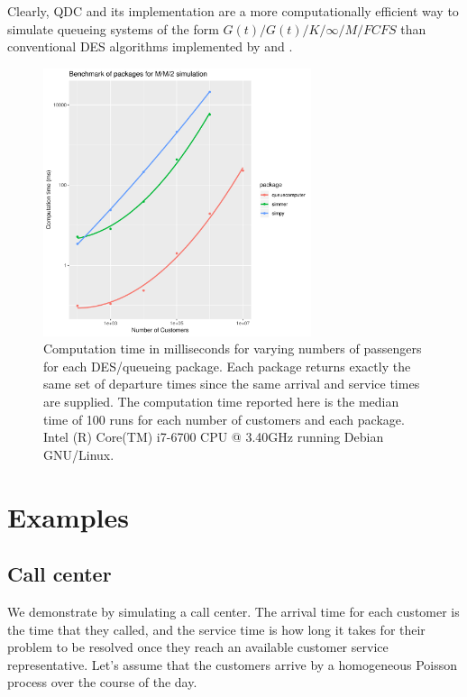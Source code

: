 \documentclass[article]{jss}
\begin{document}
Clearly, QDC and its implementation  are a more computationally efficient way to simulate queueing systems of the form $G(t)/G(t)/K/\infty/M/FCFS$ than conventional DES algorithms implemented by  and . 

\begin{figure}[!htb]
  \centering
  \includegraphics[width = 0.7\textwidth]{Figures/benchmark_083.pdf}
  \caption{Computation time in milliseconds for varying numbers of passengers for each DES/queueing package. Each package returns exactly the same set of departure times since the same arrival and service times are supplied. The computation time reported here is the median time of 100 runs for each number of customers and each package. Intel (R) Core(TM) i7-6700
CPU @ 3.40GHz running Debian GNU/Linux.
 }
  \label{fig:bm_numberofpassengers}
\end{figure}

\newpage

\section{Examples} \label{sec:Examples}

\subsection{Call center} \label{ssec:callcenter}

We demonstrate  by simulating a call center. The arrival time for each customer is the time that they called, and the service time is how long it takes for their problem to be resolved once they reach an available customer service representative. Let's assume that the customers arrive by a homogeneous Poisson process over the course of the day. 
\end{document}
